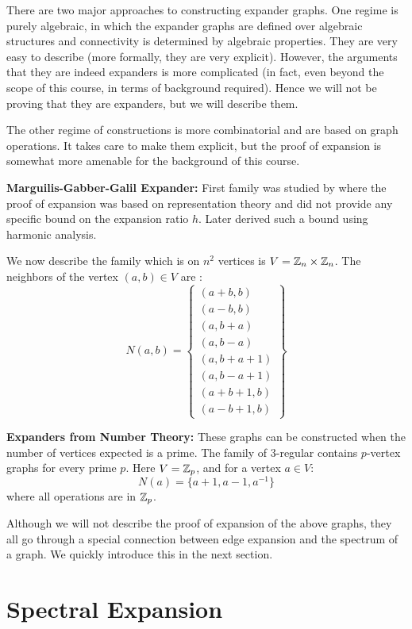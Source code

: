 There are two major approaches to constructing expander graphs. One regime is purely algebraic, in which the expander graphs are defined over algebraic structures and connectivity is determined by algebraic properties. They are very easy to describe (more formally, they are very explicit). However, the arguments that they are indeed expanders is more complicated (in fact, even beyond the scope of this course, in terms of background required). Hence we will not be proving that they are expanders, but we will describe them. 

The other regime of constructions is more combinatorial and are based on graph operations. It takes care to make them explicit, but the proof of expansion is somewhat more amenable for the background of this course.

\begin{description}
\item{\bf Marguilis-Gabber-Galil Expander:}
First family was studied by \cite{Mar73} where the proof of expansion was based on representation theory and did not provide any specific bound on the expansion ratio $h$. Later \cite{GG81} derived such a bound
using harmonic analysis.

We now describe the family which is on $n^2$ vertices 
is $V = {\mathbb{Z}}_n \times {\mathbb{Z}}_n$. The neighbors of the vertex $(a,b) \in V$ are :
$$N(a,b) = \left\{\begin{array}{l}
(a+b,b)\\
(a-b,b)\\
(a,b+a)\\
(a,b-a)\\
(a,b+a+1)\\
(a,b-a+1)\\
(a+b+1,b)\\
(a-b+1,b)
\end{array}
\right\}
$$
\item{\bf Expanders from Number Theory:}
These graphs can be constructed when the number of vertices expected is a prime. The family of $3$-regular contains $p$-vertex graphs for every prime $p$. Here $V = {\mathbb{Z}}_p$, and for a vertex $a \in V$: 
$$N(a) = \{a+1,a-1,a^{-1}\}$$
where all operations are in ${\mathbb{Z}}_p$.
\end{description}

Although we will not describe the proof of expansion of the above graphs, they all go through a special connection between edge expansion and the spectrum of a graph. We quickly introduce this in the next section.

\section{Spectral Expansion}
\label{sec:spectral-expansion}


